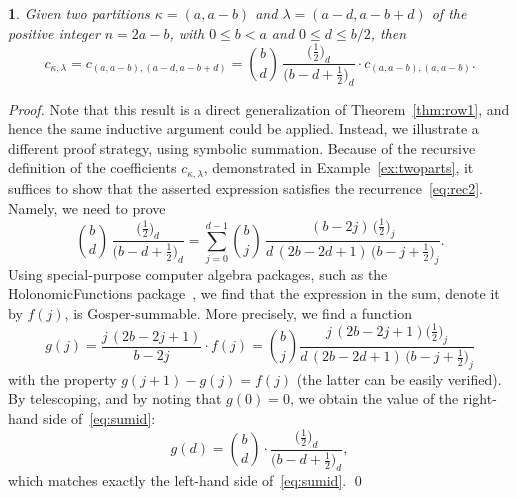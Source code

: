 \documentclass[smallextended]{svjour3}
\newtheorem{prop}[thm]{\protect\propositionname}
\providecommand{\propositionname}{Proposition}
\begin{document}
\begin{prop}\label{prop:p2row}
  Given two partitions $\kappa=(a,a-b)$ and $\lambda=(a-d,a-b+d)$ of the positive integer $n=2a-b$,
  with $0\leq b<a$ and $0\leq d\leq b/2$, then
  \begin{equation}\label{eq:2PartRec}
    c_{\kappa,\lambda} = c_{(a,a-b),(a-d,a-b+d)} =
    \binom{b}{d}\,\frac{\bigl(\frac12\bigr)_{\!d}}{\bigl(b-d+\frac12\bigr)_{\!d}} \cdot c_{(a,a-b),(a,a-b)}.
  \end{equation}
\end{prop}
\begin{proof}
  Note that this result is a direct generalization of Theorem~\ref{thm:row1},
  and hence the same inductive argument could be applied. Instead, we
  illustrate a different proof strategy, using symbolic summation. Because of
  the recursive definition of the coefficients $c_{\kappa,\lambda}$,
  demonstrated in Example~\ref{ex:twoparts}, it suffices to show that the
  asserted expression satisfies the recurrence~\eqref{eq:rec2}. Namely, we
  need to prove
  \begin{equation}\label{eq:sumid}
    \binom{b}{d}\,\frac{\bigl(\frac12\bigr)_{\!d}}{\bigl(b-d+\frac12\bigr)_{\!d}} =
    \sum_{j=0}^{d-1} \binom{b}{j}\,\frac{(b-2j)\,\bigl(\frac12\bigr)_{\!j}}{d\,(2b-2d+1)\,\bigl(b-j+\frac12\bigr)_{\!j}}.
  \end{equation}
  Using special-purpose computer algebra packages, such as the
  HolonomicFunctions package~\cite{HolonomicFunctions}, we find that the
  expression in the sum, denote it by $f(j)$, is Gosper-summable. More
  precisely, we find a function
  \[
    g(j) = \frac{j\,(2b-2j+1)}{b-2j} \cdot f(j) =
    \binom{b}{j}\frac{j\,(2b-2j+1) \bigl(\frac12\bigr)_{\!j}}{d\,(2b-2d+1)\,\bigl(b-j+\frac12\bigr)_{\!j}}
  \]
  with the property $g(j+1)-g(j)=f(j)$ (the latter can be easily
  verified). By telescoping, and by noting that $g(0)=0$, we obtain
  the value of the right-hand side of~\eqref{eq:sumid}:
  \[
    g(d) = \binom{b}{d}\cdot\frac{\bigl(\frac12\bigr)_{\!d}}{\bigl(b-d+\frac12\bigr)_{\!d}},
  \]
  which matches exactly the left-hand side of~\eqref{eq:sumid}. \qed
\end{proof}
\end{document}
